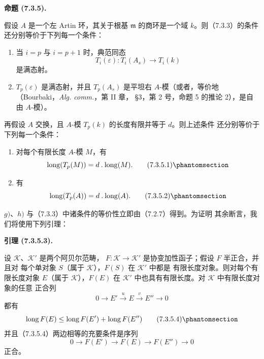 \documentclass[UTF8,fontset=none,11pt,oneside,openany]{ctexbook}
\newenvironment{lemma}[1][]{%
  \par\medskip\noindent\textbf{引理 (#1).}\ %
}{\par}
\newenvironment{proposition}[1][]{%
  \par\medskip\noindent\textbf{命题 (#1).}\ %
}{\par}
\let\EGAOriginalLabel\label
\renewcommand{\label}[1]{\phantomsection\EGAOriginalLabel{#1}}
\begin{document}
\begin{proposition}[7.3.5]
假设 $A$ 是一个左 Artin 环，其关于根基 $\mathfrak m$ 的商环是一个域
$k$。则（7.3.3）的条件还分别等价于下列每一个条件：
\begin{enumerate}
  \item[g)] 当 $i=p$ 与 $i=p+1$ 时，典范同态
    \[
      T_i(\varepsilon):T_i(A_s)\longrightarrow T_i(k)
    \]
    是满态射。
  \item[h)] $T_p(\varepsilon)$ 是满态射，并且 $T_p(A_s)$ 是平坦右
    $A$-模（或者，等价地（Bourbaki，\emph{Alg. comm.}，第 II 章，
    \S 3，第 2 号，命题 5 的推论 2），是自由 $A$-模）。
\end{enumerate}
再假设 $A$ 交换，且 $A$-模 $T_p(k)$ 的长度有限并等于 $d$。则上述条件
还分别等价于下列每一个条件：
\begin{enumerate}
  \item[i)] 对每个有限长度 $A$-模 $M$，有
    \[
      \operatorname{long}(T_p(M))=d\mathbin{.}\operatorname{long}(M).
      \tag{7.3.5.1}\label{III.7.3.5.1.fr}
    \]
  \item[j)] 有
    \[
      \operatorname{long}(T_p(A))=d\mathbin{.}\operatorname{long}(A).
      \tag{7.3.5.2}\label{III.7.3.5.2.fr}
    \]
\end{enumerate}
\end{proposition}

$g)$、$h)$ 与（7.3.3）中诸条件的等价性立即由（7.2.7）得到。为证明
其余断言，我们将使用下列引理：

\begin{lemma}[7.3.5.3]
设 $\mathcal K$、$\mathcal K'$ 是两个阿贝尔范畴，
$F:\mathcal K\to\mathcal K'$ 是协变加性函子；假设 $F$ 半正合，并且对
每个单对象 $S$（属于 $\mathcal K$），$F(S)$ 在 $\mathcal K'$ 中都是
有限长度对象。则对每个有限长度对象 $E$（属于 $\mathcal K$），$F(E)$ 在
$\mathcal K'$ 中也具有有限长度。对 $\mathcal K$ 中有限长度对象的任意
正合列
\[
  0\longrightarrow E'\xrightarrow{u}E\xrightarrow{v}E''\longrightarrow0
\]
都有
\[
  \operatorname{long}F(E)
  \leq
  \operatorname{long}F(E')+\operatorname{long}F(E'')
  \tag{7.3.5.4}\label{III.7.3.5.4.fr}
\]
并且（7.3.5.4）两边相等的充要条件是序列
\[
  0\longrightarrow F(E')\longrightarrow F(E)\longrightarrow F(E'')
  \longrightarrow0
\]
正合。
\end{lemma}
\end{document}
